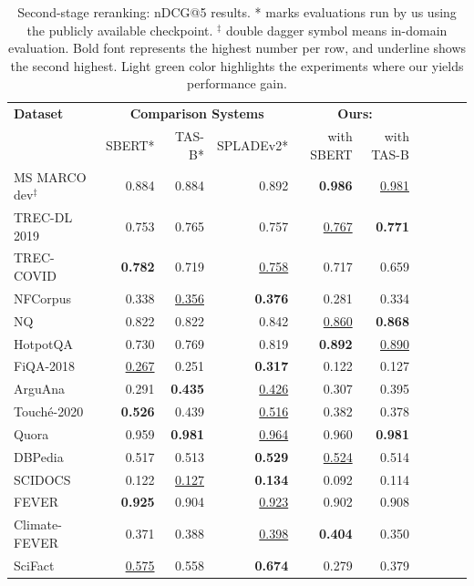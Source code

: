\documentclass{article}
\begin{document}
\begin{table}[tb!] 
    \caption{Second-stage reranking: nDCG@5 results. * marks evaluations run by us using the publicly available checkpoint. $^\ddagger$ double dagger symbol means in-domain evaluation. Bold font represents the highest number per row, and underline shows the second highest. Light green color highlights the experiments where our \alg{} yields performance gain.} 
    \vspace{5pt}
    \centering \small
    \begin{tabular}{l r r r r r r r r r }
        \toprule
        \textbf{Dataset} & \multicolumn{3}{c}{\textbf{Comparison Systems}} & \multicolumn{2}{c}{\textbf{Ours: \alg{}}} \\
            & SBERT* & TAS-B* & SPLADEv2* & with SBERT & with TAS-B   \\ 
        \midrule
MS MARCO dev$^\ddagger$ & 0.884 & 0.884 & 0.892 & \cellcolor{lightgreen}\textbf{0.986} & \cellcolor{lightgreen}\underline{0.981}\\
TREC-DL 2019 & 0.753 & 0.765 & 0.757 & \cellcolor{lightgreen}\underline{0.767} & \cellcolor{lightgreen}\textbf{0.771}\\
TREC-COVID & \textbf{0.782} & 0.719 & \underline{0.758} & 0.717 & 0.659\\
NFCorpus & 0.338 & \underline{0.356} & \textbf{0.376} & 0.281 & 0.334\\
NQ & 0.822 & 0.822 & 0.842 & \cellcolor{lightgreen}\underline{0.860} & \cellcolor{lightgreen}\textbf{0.868}\\
HotpotQA & 0.730 & 0.769 & 0.819 & \cellcolor{lightgreen}\textbf{0.892} & \cellcolor{lightgreen}\underline{0.890}\\
FiQA-2018 & \underline{0.267} & 0.251 & \textbf{0.317} & 0.122 & 0.127\\
ArguAna & 0.291 & \textbf{0.435} & \underline{0.426} & \cellcolor{lightgreen}0.307 & 0.395\\
Touché-2020   & \textbf{0.526} & 0.439 & \underline{0.516} & 0.382 & 0.378\\
Quora & 0.959 & \textbf{0.981} & \underline{0.964} & \cellcolor{lightgreen}0.960 & \cellcolor{lightgreen}\textbf{0.981}\\
DBPedia & 0.517 & 0.513 & \textbf{0.529} & \cellcolor{lightgreen}\underline{0.524} & \cellcolor{lightgreen}0.514\\
SCIDOCS & 0.122 & \underline{0.127} & \textbf{0.134} & 0.092 & 0.114\\
FEVER & \textbf{0.925} & 0.904 & \underline{0.923} & 0.902 & \cellcolor{lightgreen}0.908\\
Climate-FEVER & 0.371 & 0.388 & \underline{0.398} & \cellcolor{lightgreen}\textbf{0.404} & 0.350\\
SciFact & \underline{0.575} & 0.558 & \textbf{0.674} & 0.279 & 0.379\\
        \bottomrule
    \end{tabular}
    \vspace{-10pt}
    \label{tab:eval_rerank_ndcg5}
\end{table}
\end{document}
